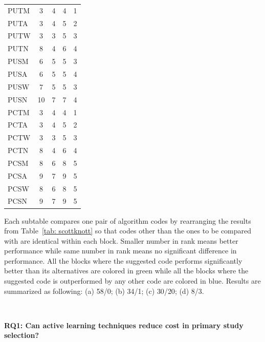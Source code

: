 \documentclass{svjour3}
\theoremstyle{break}
\newcommand{\respto}[1]{
\fcolorbox{black}{black!15}{
\label{response:#1}
\bf
  \scriptsize R-{#1}}~
}
\begin{document}
\begin{table}
\begin{center}
{{{\begin{tabular}{l@{~~~}|c@{~~~}c@{~~~}c@{~~~}c}
PUTM & 3 &\cellcolor{blue!50} 4 & \cellcolor{green!40}4 &\cellcolor{green!40} 1\\
PUTA & 3 & 4 & 5 & 2\\
PUTW & 3 & 3 & 5 & 3\\
PUTN & 8 & 4 & 6 & 4\\
\hline
PUSM & 6 & 5 & 5 & 3\\
PUSA & 6 & 5 & 5 & 4\\
PUSW & 7 & 5 & 5 & 3\\
PUSN & 10 & 7 & 7 & 4\\
\hline
PCTM & 3 & \cellcolor{blue!50}4 & \cellcolor{green!40}4 &\cellcolor{green!40} 1\\
PCTA & 3 & 4 & 5 & 2\\
PCTW & 3 & 3 & 5 & 3\\
PCTN & 8 & 4 & 6 & 4\\
\hline
PCSM & 8 & 6 & 8 & 5\\
PCSA & 9 & 7 & 9 & 5\\
PCSW & 8 & 6 & 8 & 5\\
PCSN & 9 & 7 & 9 & 5\\
\hline
\end{tabular}}
}}
\end{center}
{\footnotesize Each subtable compares one pair of algorithm codes by rearranging the results from Table~\ref{tab: scottknott} so that codes other than the ones to be compared with are identical within each block. Smaller number in rank means better performance while same number in rank means no significant difference in performance. All the blocks where the suggested code performs significantly better than its alternatives are colored in {\setlength{\fboxsep}{1pt}\colorbox{green!40}{green}} while all the blocks where the suggested code is outperformed by any other code are colored in {\setlength{\fboxsep}{1pt}\colorbox{blue!50}{blue}}. Results are summarized as following: (a) {\setlength{\fboxsep}{1pt}\colorbox{green!40}{58}}/{\setlength{\fboxsep}{1pt}\colorbox{blue!50}{0}}; (b) {\setlength{\fboxsep}{1pt}\colorbox{green!40}{34}}/{\setlength{\fboxsep}{1pt}\colorbox{blue!50}{1}}; (c) {\setlength{\fboxsep}{1pt}\colorbox{green!40}{30}}/{\setlength{\fboxsep}{1pt}\colorbox{blue!50}{20}}; (d) {\setlength{\fboxsep}{1pt}\colorbox{green!40}{8}/\colorbox{blue!50}{3}}.
}
\end{table}




\respto{1e1}
{\bf RQ1: Can active learning techniques reduce cost in primary study selection?} 
\end{document}
